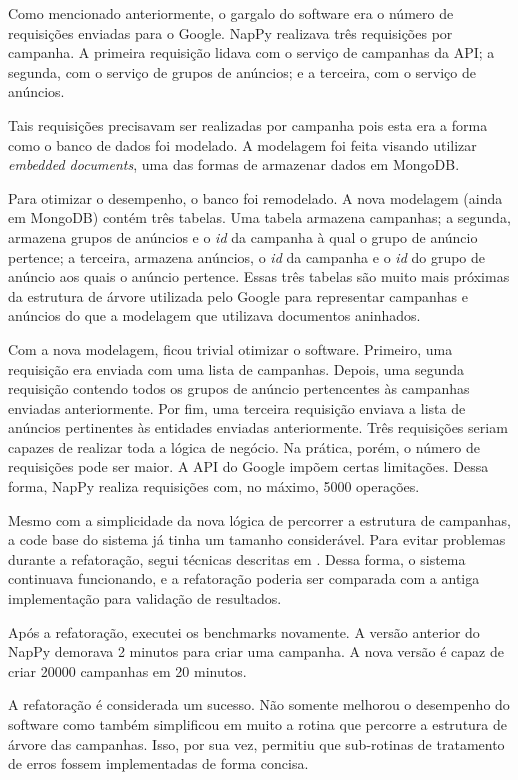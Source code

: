 Como mencionado anteriormente, o gargalo do software era o
número de requisições enviadas para o Google. NapPy realizava
três requisições por campanha. A primeira requisição lidava com
o serviço de campanhas da API; a segunda, com o serviço de grupos
de anúncios; e a terceira, com o serviço de anúncios.

Tais requisições precisavam ser realizadas por campanha pois esta
era a forma como o banco de dados foi modelado. A modelagem foi
feita visando utilizar \emph{embedded documents}, uma das formas
de armazenar dados em MongoDB.

Para otimizar o desempenho, o banco foi remodelado. A nova
modelagem (ainda em MongoDB) contém três tabelas. Uma tabela
armazena campanhas; a segunda, armazena grupos de anúncios e o
\emph{id} da campanha à qual o grupo de anúncio pertence; a
terceira, armazena anúncios, o \emph{id} da campanha e o
\emph{id} do grupo de anúncio aos quais o anúncio pertence.
Essas três tabelas são muito mais próximas da estrutura de árvore
utilizada pelo Google para representar campanhas e anúncios do
que a modelagem que utilizava documentos aninhados.

Com a nova modelagem, ficou trivial otimizar o software.
Primeiro, uma requisição era enviada com uma lista de
campanhas. Depois, uma segunda requisição contendo todos os
grupos de anúncio pertencentes às campanhas enviadas
anteriormente. Por fim, uma terceira requisição enviava a lista
de anúncios pertinentes às entidades enviadas anteriormente. Três
requisições seriam capazes de realizar toda a lógica de negócio.
Na prática, porém, o número de requisições pode ser maior. A API
do Google impõem certas limitações. Dessa forma, NapPy realiza
requisições com, no máximo, 5000 operações.

Mesmo com a simplicidade da nova lógica de percorrer a estrutura
de campanhas, a code base do sistema já tinha um tamanho
considerável. Para evitar problemas durante a refatoração, segui
técnicas descritas em \cite{Legacy}. Dessa forma, o sistema
continuava funcionando, e a refatoração poderia ser comparada com
a antiga implementação para validação de resultados.

Após a refatoração, executei os benchmarks novamente. A versão
anterior do NapPy demorava 2 minutos para criar uma campanha. A
nova versão é capaz de criar 20000 campanhas em 20 minutos.

A refatoração é considerada um sucesso. Não somente melhorou o
desempenho do software como também simplificou em muito a rotina
 que percorre a estrutura de árvore das campanhas. Isso, por
sua vez, permitiu que sub-rotinas de tratamento de erros fossem
implementadas de forma concisa.

